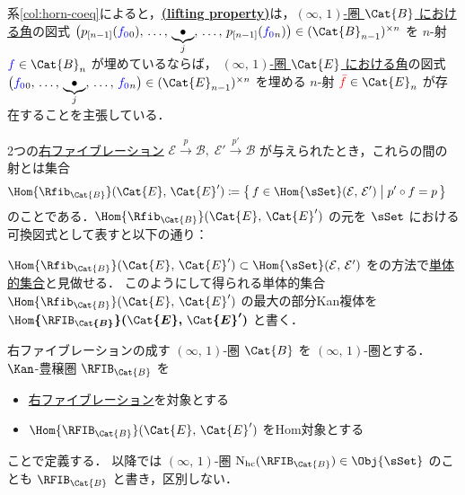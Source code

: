 \documentclass[TQFT_main]{subfiles}
\begin{document}
系\ref{col:horn-coeq}によると，\hyperref[def:infty-R-fib]{\textsf{\textbf{(lifting property)}}}は，\underline{$(\infty,\, 1)$-圏 $\Cat{B}$ における}\hyperref[def:horn]{角}の図式
$\bigl(p_{[n-1]}(\textcolor{blue}{f_0}{}_0),\, \dots,\, \underbrace{\bullet}_{j},\, \dots,\, p_{[n-1]}(\textcolor{blue}{f_0}{}_n)\bigr) \in (\Cat{B}_{n-1})^{\times n}$ を $n$-射 $\textcolor{blue}{f} \in \Cat{B}_n$ が埋めているならば，
\underline{$(\infty,\, 1)$-圏 $\Cat{E}$ における}\hyperref[def:horn]{角}の図式
$\bigl(\textcolor{blue}{f_{0}}{}_0,\, \dots,\, \underbrace{\bullet}_{j},\, \dots,\, \textcolor{blue}{f_0}{}_n\bigr) \in (\Cat{E}_{n-1})^{\times n}$ を埋める $n$-射 $\textcolor{red}{\bar{f}} \in \Cat{E}_n$ が存在することを主張している．

2つの\hyperref[def:infty-fib]{右ファイブレーション} $\mathcal{E} \xrightarrow{p} \mathcal{B},\; \mathcal{E}' \xrightarrow{p'} \mathcal{B}$ が与えられたとき，これらの間の射とは集合
\begin{align}
    \Hom{\Rfib_{\Cat{B}}} (\Cat{E},\, \Cat{E}') &\coloneqq 
    \bigl\{\, f \in \Hom{\sSet}(\mathcal{E},\, \mathcal{E}') \bigm| p' \circ f = p \,\bigr\}
\end{align}
のことである．$\Hom{\Rfib_{\Cat{B}}} (\Cat{E},\, \Cat{E}')$ の元を $\sSet$ における可換図式として表すと以下の通り：
\begin{center}
\end{center}
$\Hom{\Rfib_{\Cat{B}}} (\Cat{E},\, \Cat{E}') \subset \Hom{\sSet}(\mathcal{E},\, \mathcal{E}')$ をの方法で\hyperref[def:SimpSet]{単体的集合}と見做せる．
このようにして得られる単体的集合 $\Hom{\Rfib_{\Cat{B}}} (\Cat{E},\, \Cat{E}')$ の最大の部分Kan複体を $\bm{\Hom{\RFIB_{\Cat{B}}}(\Cat{E},\, \Cat{E}')}$ と書く．

\begin{mydef}[label=def:RFIB]{右ファイブレーションの成す {$(\infty,\, 1)$}-圏}
    $\Cat{B}$ を $(\infty,\, 1)$-圏とする．
    $\Kan$-豊穣圏 $\RFIB_{\Cat{B}}$ を
    \begin{itemize}
        \item \hyperref[def:infty-fib]{右ファイブレーション}を対象とする
        \item $\Hom{\RFIB_{\Cat{B}}}(\Cat{E},\, \Cat{E}')$ をHom対象とする
    \end{itemize}
    ことで定義する．
    以降では $(\infty,\, 1)$-圏 $\mathrm{N}_{\text{hc}}(\RFIB_{\Cat{B}}) \in \Obj{\sSet}$ のことも $\RFIB_{\Cat{B}}$ と書き，区別しない．
\end{mydef}
\end{document}
